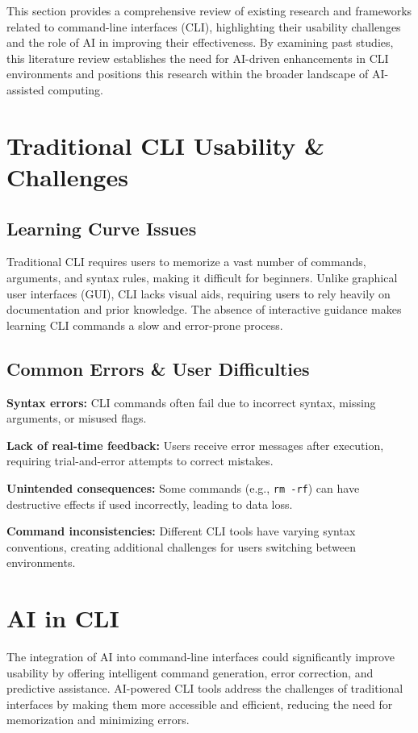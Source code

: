 This section provides a comprehensive review of existing research and frameworks related to command-line interfaces (CLI), highlighting their usability challenges and the role of AI in improving their effectiveness. By examining past studies, this literature review establishes the need for AI-driven enhancements in CLI environments and positions this research within the broader landscape of AI-assisted computing.

\section{Traditional CLI Usability \& Challenges}

\subsection{Learning Curve Issues}

Traditional CLI requires users to memorize a vast number of commands, arguments, and syntax rules, making it difficult for beginners. Unlike graphical user interfaces (GUI), CLI lacks visual aids, requiring users to rely heavily on documentation and prior knowledge. The absence of interactive guidance makes learning CLI commands a slow and error-prone process.

\subsection{Common Errors \& User Difficulties}

\textbf{Syntax errors:} CLI commands often fail due to incorrect syntax, missing arguments, or misused flags.

\textbf{Lack of real-time feedback:} Users receive error messages after execution, requiring trial-and-error attempts to correct mistakes.

\textbf{Unintended consequences:} Some commands (e.g., \texttt{rm -rf}) can have destructive effects if used incorrectly, leading to data loss.

\textbf{Command inconsistencies:} Different CLI tools have varying syntax conventions, creating additional challenges for users switching between environments.

\section{AI in CLI}

The integration of AI into command-line interfaces could significantly improve usability by offering intelligent command generation, error correction, and predictive assistance. AI-powered CLI tools address the challenges of traditional interfaces by making them more accessible and efficient, reducing the need for memorization and minimizing errors.

